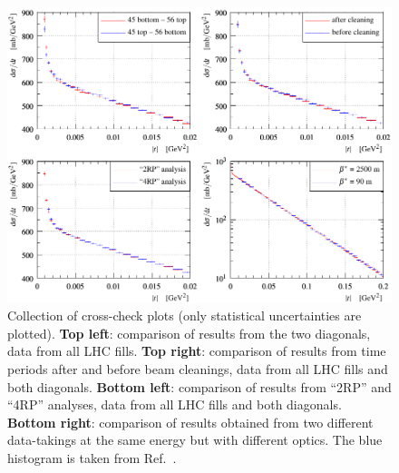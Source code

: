 \begin{figure}
\vskip-4mm
\begin{center}
\includegraphics{fig/t_dist_cross_checks.pdf}
\vskip-2mm
\caption{%
Collection of cross-check plots (only statistical uncertainties are plotted).
{\bf Top left}: comparison of results from the two diagonals, data from all LHC fills.
{\bf Top right}: comparison of results from time periods after and before beam cleanings, data from all LHC fills and both diagonals.
{\bf Bottom left}: comparison of results from ``2RP'' and ``4RP'' analyses, data from all LHC fills and both diagonals.
{\bf Bottom right}: comparison of results obtained from two different data-takings at the same energy but with different optics. The blue histogram is taken from Ref.~\cite{totem-13tev-90m}.
}
\label{fig:dsdt checks}
\end{center}
\end{figure}



